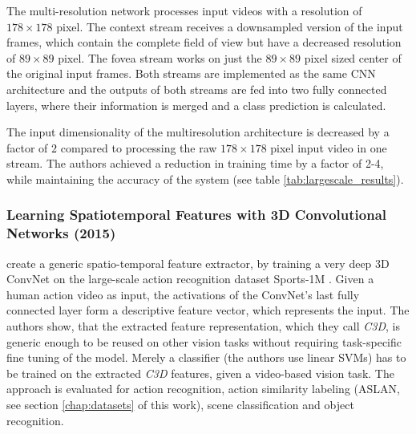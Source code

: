 The multi-resolution network processes input videos with a resolution of $178\times178$ pixel.
The context stream receives a downsampled version of the input frames, which contain the complete field of view but have a decreased resolution of $89\times89$ pixel.
The fovea stream works on just the $89\times89$ pixel sized center of the original input frames.
Both streams are implemented as the same CNN architecture and the outputs of both streams are fed into two fully connected layers, where their information is merged and a class prediction is calculated.

The input dimensionality of the multiresolution architecture is decreased by a factor of $2$ compared to processing the raw $178\times178$ pixel input video in one stream.
The authors achieved a reduction in training time by a factor of 2-4, while maintaining the accuracy of the system (see table \ref{tab:largescale_results}).


\subsubsection{Learning Spatiotemporal Features with 3D Convolutional Networks (2015)}
\textcite{tran_learning_2015} create a generic spatio-temporal feature extractor, by training a very deep 3D ConvNet on the large-scale action recognition dataset Sports-1M \cite{karpathy_large-scale_2014}.
Given a human action video as input, the activations of the ConvNet's last fully connected layer form a descriptive feature vector, which represents the input.
The authors show, that the extracted feature representation, which they call \textit{C3D}, is generic enough to be reused on other vision tasks without requiring task-specific fine tuning of the model.
Merely a classifier (the authors use linear SVMs) has to be trained on the extracted \textit{C3D} features, given a video-based vision task.
The approach is evaluated for action recognition, action similarity labeling (ASLAN, see section \ref{chap:datasets} of this work), scene classification and object recognition.

